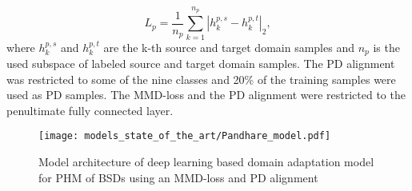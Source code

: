 \begin{equation}
    L_{p} = \frac{1}{n_{p}}\sum_{k=1}^{n_{p}}|h_{k}^{p,s}-h_{k}^{p,t}|_{2}, 
\end{equation}
where $h_{k}^{p,s}$ and $h_{k}^{p,t}$ are the k-th source and target domain samples and $n_{p}$ is the used subspace of labeled source and target domain samples. The PD alignment was restricted to some of the nine classes and 20\% of the training samples were used as PD samples. The MMD-loss and the PD alignment were restricted to the penultimate fully connected layer.
\begin{figure}[H]
  \centering
  \texttt{[image: models\_state\_of\_the\_art/Pandhare\_model.pdf]}
  \caption{Model architecture of deep learning based domain adaptation model for PHM of BSDs using an MMD-loss and PD alignment \cite{Pandhare2021}}
  \label{fig:Pandhare_model}
\end{figure}

